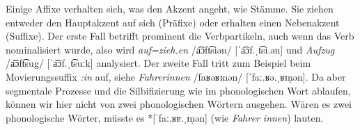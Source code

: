 Einige Affixe verhalten sich, was den Akzent angeht, wie Stämme.
Sie ziehen entweder den Hauptakzent auf sich (Präfixe) oder erhalten einen Nebenakzent (Suffixe).
Der erste Fall betrifft prominent die Verbpartikeln, auch wenn das Verb nominalisiert wurde, also wird \textit{auf=zieh.en} /a͡ɔft͡siən/ [ˈa͡ɔf.ˌt͡si.ən] und \textit{Aufzug} /a͡ɔft͡sug/ [ˈa͡ɔf.ˌt͡suːk] analysiert.
Der zweite Fall tritt zum Beispiel beim Movierungssuffix \textit{:in} auf, siehe \textit{Fahrerinnen} /faʁəʁɪnən/ [ˈfaː.ʁə.ˌʁɪṇən].
Da aber segmentale Prozesse und die Silbifizierung wie im phonologischen Wort ablaufen, können wir hier nicht von zwei phonologischen Wörtern ausgehen.
Wären es zwei phonologische Wörter, müsste es *[ˈfaː.ʁɐ.ˌɪṇən] (wie \textit{Fahrer innen}) lauten.
